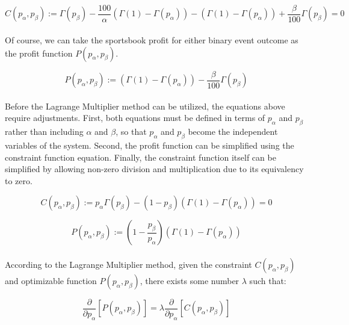 \documentclass[12pt,letterpaper]{article}
\begin{document}
\begin{equation}
C(p_\alpha,p_\beta) := \Gamma(p_\beta) - \frac{100}{\alpha}(\Gamma(1)-\Gamma(p_\alpha)) - (\Gamma(1)-\Gamma(p_\alpha)) + \frac{\beta}{100}\Gamma(p_\beta) = 0
\end{equation}

\paragraph{} Of course, we can take the sportsbook profit for either binary event outcome as the profit function $P(p_\alpha,p_\beta)$.

\begin{equation}
P(p_\alpha,p_\beta) := (\Gamma(1)-\Gamma(p_\alpha)) - \frac{\beta}{100}\Gamma(p_\beta)
\end{equation}

\paragraph{} Before the Lagrange Multiplier method can be utilized, the equations above require adjustments. First, both equations must be defined in terms of $p_\alpha$ and $p_\beta$ rather than including $\alpha$ and $\beta$, so that $p_\alpha$ and $p_\beta$ become the independent variables of the system. Second, the profit function can be simplified using the constraint function equation. Finally, the constraint function itself can be simplified by allowing non-zero division and multiplication due to its equivalency to zero.

\begin{equation}
C(p_\alpha,p_\beta) := p_\alpha \Gamma(p_\beta) - (1-p_\beta)(\Gamma(1)-\Gamma(p_\alpha)) = 0
\end{equation}

\begin{equation}
P(p_\alpha,p_\beta) := (1-\frac{p_\beta}{p_\alpha})(\Gamma(1)-\Gamma(p_\alpha))
\end{equation}

\paragraph{} According to the Lagrange Multiplier method, given the constraint $C(p_\alpha,p_\beta)$ and optimizable function $P(p_\alpha,p_\beta)$, there exists some number $\lambda$ such that:

\begin{equation}
\frac{\partial}{\partial p_\alpha} [P(p_\alpha,p_\beta)] = \lambda \frac{\partial}{\partial p_\alpha} [C(p_\alpha,p_\beta)] 
\end{equation}
\end{document}
